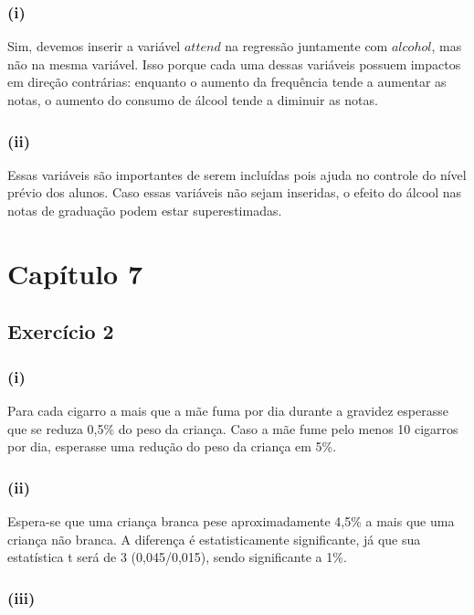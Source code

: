 \documentclass[hidelinks,11pt]{book}
\theoremstyle{definition}
\begin{document}
\subsubsection*{(i)}

Sim, devemos inserir a variável $attend$ na regressão juntamente com $alcohol$, mas não na mesma variável. Isso porque cada uma dessas variáveis possuem impactos em direção contrárias: enquanto o aumento da frequência tende a aumentar as notas, o aumento do consumo de álcool tende a diminuir as notas. 


\subsubsection*{(ii)}

Essas variáveis são importantes de serem incluídas pois ajuda no controle do nível prévio dos alunos. Caso essas variáveis não sejam inseridas, o efeito do álcool nas notas de graduação podem estar superestimadas.


	\section*{Capítulo 7}
	
\subsection*{Exercício 2}

\subsubsection*{(i)}

Para cada cigarro a mais que a mãe fuma por dia durante a gravidez esperasse que se reduza 0,5\% do peso da criança. Caso a mãe fume pelo menos 10 cigarros por dia, esperasse uma redução do peso da criança em 5\%.

\subsubsection*{(ii)}

Espera-se que uma criança branca pese aproximadamente 4,5\% a mais que uma criança não branca. A diferença é estatisticamente significante, já que sua estatística t será de 3 (0,045/0,015), sendo significante a 1\%.


\subsubsection*{(iii)}
\end{document}
